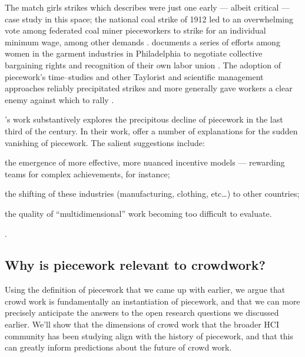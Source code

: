 \documentclass[trackingWork]{subfiles}
\begin{document}
The match girls strikes which \citeauthor{10.2307/3827491} describes were just one early
--- albeit critical ---
case study in this space;
the national coal strike of 1912 led to an overwhelming vote among federated coal miner pieceworkers
to strike for
an individual minimum wage, among other demands
\cite{10.2307/2221944}.
\citeauthor{10.2307/41829256} documents a series of efforts among women in the garment industries in Philadelphia to negotiate collective bargaining rights and recognition of their own labor union
\cite{10.2307/41829256}.
The adoption of piecework's time--studies and other Taylorist and scientific management approaches reliably precipitated strikes and more generally gave workers a clear enemy against which to rally
\cite{jacoby1983union}.

\citeauthor{hart2013rise}'s work substantively explores the precipitous decline of piecework in the last third of the  century.
In their work, \citeauthor{hart2013rise} offer a number of explanations for the sudden vanishing of piecework.
The salient suggestions include:
\begin{inlinelist}
\item the emergence of more effective, more nuanced incentive models
--- rewarding teams for complex achievements, for instance;
\item the shifting of these industries (manufacturing, clothing, etc\dots)
to other countries;
\item the quality of ``multidimensional'' work becoming too difficult to evaluate.
\end{inlinelist}
\cite{hart2013rise}.




\subsection{Why is piecework relevant to crowdwork?}

Using the definition of piecework that we came up with earlier, we argue that
crowd work is fundamentally an instantiation of piecework, and
that we can more precisely anticipate the answers to the open research questions we discussed earlier.
We'll show that the dimensions of crowd work that the broader HCI community has been studying
align with the history of piecework, and that this can greatly inform predictions about the future of crowd work.
\end{document}
